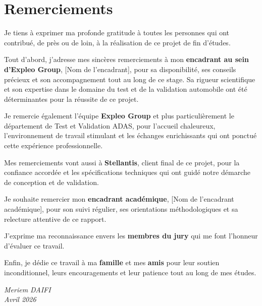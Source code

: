 
\chapter*{Remerciements}

\vspace{1cm}

Je tiens à exprimer ma profonde gratitude à toutes les personnes qui ont contribué, de près ou de loin, à la réalisation de ce projet de fin d'études.

\vspace{0.5cm}

Tout d'abord, j'adresse mes sincères remerciements à mon \textbf{encadrant au sein d'Expleo Group}, [Nom de l'encadrant], pour sa disponibilité, ses conseils précieux et son accompagnement tout au long de ce stage. Sa rigueur scientifique et son expertise dans le domaine du test et de la validation automobile ont été déterminantes pour la réussite de ce projet.

\vspace{0.5cm}

Je remercie également l'équipe \textbf{Expleo Group} et plus particulièrement le département de Test et Validation ADAS, pour l'accueil chaleureux, l'environnement de travail stimulant et les échanges enrichissants qui ont ponctué cette expérience professionnelle.

\vspace{0.5cm}

Mes remerciements vont aussi à \textbf{Stellantis}, client final de ce projet, pour la confiance accordée et les spécifications techniques qui ont guidé notre démarche de conception et de validation.

\vspace{0.5cm}

Je souhaite remercier mon \textbf{encadrant académique}, [Nom de l'encadrant académique], pour son suivi régulier, ses orientations méthodologiques et sa relecture attentive de ce rapport.

\vspace{0.5cm}

J'exprime ma reconnaissance envers les \textbf{membres du jury} qui me font l'honneur d'évaluer ce travail.

\vspace{0.5cm}

Enfin, je dédie ce travail à ma \textbf{famille} et mes \textbf{amis} pour leur soutien inconditionnel, leurs encouragements et leur patience tout au long de mes études.

\vspace{2cm}

\begin{flushright}
\textit{Meriem DAIFI}\\
\textit{Avril 2026}
\end{flushright}
